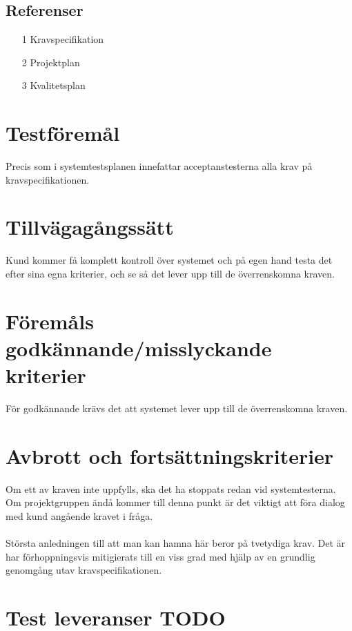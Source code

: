 \documentclass[10pt]{article}
\begin{document}
	\subsection{Referenser}
		\begin{itemize}
		\item [1] Kravspecifikation
		\item [2] Projektplan
		\item [3] Kvalitetsplan
		\end{itemize}

	
\section{Testföremål}
	Precis som i systemtestsplanen innefattar acceptanstesterna alla krav på kravspecifikationen.
	



\section{Tillvägagångssätt}
	Kund kommer få komplett kontroll över systemet och på egen hand testa det efter sina egna kriterier, och se så det lever upp till de överrenskomna kraven. \\
	
	

\section{Föremåls godkännande/misslyckande kriterier}
	För godkännande krävs det att systemet lever upp till de överrenskomna kraven.


\section{Avbrott och fortsättningskriterier}
	Om ett av kraven inte uppfylls, ska det ha stoppats redan vid systemtesterna. Om projektgruppen ändå kommer till denna punkt är det viktigt att föra dialog med kund angående kravet i fråga.\\
	\\
	Största anledningen till att man kan hamna här beror på tvetydiga krav. Det är har förhoppningsvis mitigierats till en viss grad med hjälp av en grundlig genomgång utav kravspecifikationen.


\section{Test leveranser {\color{red}TODO}}
	
\end{document}
